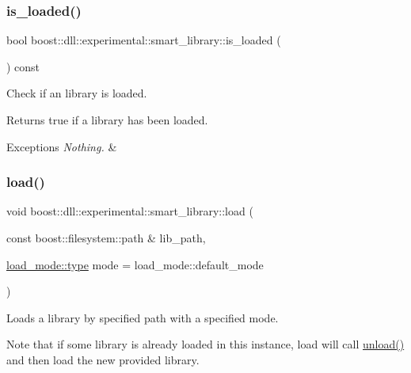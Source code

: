 \subsubsection{\texorpdfstring{is\+\_\+loaded()}{is\_loaded()}}
{\footnotesize\ttfamily bool boost\+::dll\+::experimental\+::smart\+\_\+library\+::is\+\_\+loaded (\begin{DoxyParamCaption}{ }\end{DoxyParamCaption}) const\hspace{0.3cm}{\ttfamily [inline]}}





Check if an library is loaded.

\begin{DoxyReturn}{Returns}
true if a library has been loaded. 
\end{DoxyReturn}

\begin{DoxyExceptions}{Exceptions}
{\em Nothing.} & \\
\hline
\end{DoxyExceptions}
\mbox{\label{a01712_af80edac534fd278f4f162ac3abadfc2b}} 
\subsubsection{\texorpdfstring{load()}{load()}\hspace{0.1cm}{\footnotesize\ttfamily [1/3]}}
{\footnotesize\ttfamily void boost\+::dll\+::experimental\+::smart\+\_\+library\+::load (\begin{DoxyParamCaption}\item[{const boost\+::filesystem\+::path \&}]{lib\+\_\+path,  }\item[{\hyperlink{a00272_a1918a602801479bc0bade54ff5665129}{load\+\_\+mode\+::type}}]{mode = {\ttfamily load\+\_\+mode\+:\+:default\+\_\+mode} }\end{DoxyParamCaption})\hspace{0.3cm}{\ttfamily [inline]}}





Loads a library by specified path with a specified mode.

Note that if some library is already loaded in this instance, load will call \hyperlink{a01712_a2b96d7817794a2adabe1f7bb22be5483}{unload()} and then load the new provided library.


